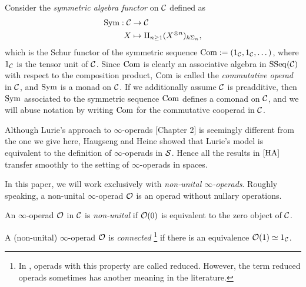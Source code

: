 \begin{example}
\label{Symmetric algebra}
	Consider the \emph{symmetric algebra functor} on ${\mathcal{C}}$ defined as 
	\begin{align*}
		\operatorname{Sym}:{\mathcal{C}} & \to  {\mathcal{C}}\\
		X & \mapsto \amalg_{n\geq 1} (X^{\otimes n})_{h\Sigma_n},
	\end{align*}
	which is the Schur functor of the symmetric sequence $\operatorname{Com}:=(1_{\mathcal{C}},1_{\mathcal{C}},\dots)$, where $1_{\mathcal{C}}$ is the tensor unit of ${\mathcal{C}}$.
	Since $\operatorname{Com}$ is clearly an associative algebra in $\operatorname{SSeq}({\mathcal{C}})$ with respect to the 
	composition product, $\operatorname{Com}$ is called the \emph{commutative operad} in ${\mathcal{C}}$, and
	$\operatorname{Sym}$ is a monad on ${\mathcal{C}}$.
	If we additionally assume ${\mathcal{C}}$ is preadditive, then $\operatorname{Sym}$ associated to the symmetric sequence $\operatorname{Com}$ defines a comonad on ${\mathcal{C}}$, and we will abuse notation by writing $\operatorname{Com}$ for the commutative cooperad in ${\mathcal{C}}$.
\end{example}

\begin{remark}
Although Lurie's approach to $\infty$-operads \cite{HA}[Chapter 2] is seemingly different from the one we give here,
Haugseng \cite{Haugsengsymseq} and Heine \cite{Hadrianphdthesis} showed that Lurie's model is equivalent to the definition of $\infty$-operads in $\operatorname{\mathcal{S}}$. Hence all the results in $\cite{HA}$ transfer smoothly to the setting of $\infty$-operads in spaces.
\end{remark}

In this paper, we will work exclusively with \emph{non-unital $\infty$-operads}. Roughly speaking, a non-unital $\infty$-operad ${\mathcal{O}}$ is an operad without nullary operations.
\begin{definition}
	\label{non-unital operad}
	An $\infty$-operad ${\mathcal{O}}$ in ${\mathcal{C}}$ is \emph{non-unital} if ${\mathcal{O}}(0)$ is equivalent to the zero object of ${\mathcal{C}}$. 
\end{definition}

\begin{definition}
	A (non-unital) $\infty$-operad ${\mathcal{O}}$ is \emph{connected} \footnote{In \cite{ChingBar}, operads with this property are called reduced. However, the term reduced operads sometimes has another meaning in the literature.} if there is an equivalence ${\mathcal{O}}(1)\simeq 1_{{\mathcal{C}}}$. 
\end{definition}


